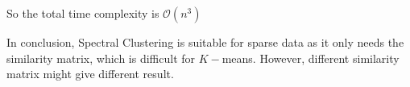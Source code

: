 \documentclass[catalog.tex]{subfiles}
\begin{document}
So the total time complexity is $\mathcal{O}(n^3)$

In conclusion, Spectral Clustering is suitable for sparse data as it only needs the similarity matrix, which is difficult for $K-$means. However, different similarity matrix might give different result. 

\singlespacing
\printbibliography[title={References.},resetnumbers=true,heading=subbibliography]
\end{document}
